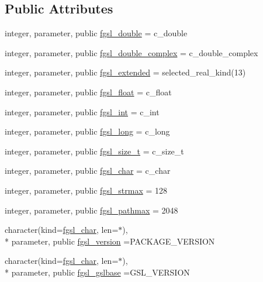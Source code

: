 \subsection*{Public Attributes}
\begin{DoxyCompactItemize}
\item 
integer, parameter, public \hyperlink{classfgsl_a9af5113378e0f000eb479d3f90196ddf}{fgsl\-\_\-double} = c\-\_\-double
\item 
integer, parameter, public \hyperlink{classfgsl_a66d0fde3788cc0c300046f8fcd07d702}{fgsl\-\_\-double\-\_\-complex} = c\-\_\-double\-\_\-complex
\item 
integer, parameter, public \hyperlink{classfgsl_a9f38abe97062020e8a507aaa5bc683ab}{fgsl\-\_\-extended} = selected\-\_\-real\-\_\-kind(13)
\item 
integer, parameter, public \hyperlink{classfgsl_a5721fab55a48ca577c4557fdb1861eb6}{fgsl\-\_\-float} = c\-\_\-float
\item 
integer, parameter, public \hyperlink{classfgsl_a222deda1d7a0c0e845ce4a683318efeb}{fgsl\-\_\-int} = c\-\_\-int
\item 
integer, parameter, public \hyperlink{classfgsl_a22fca1111887118eb07d5f9688ea38ad}{fgsl\-\_\-long} = c\-\_\-long
\item 
integer, parameter, public \hyperlink{classfgsl_a82c8fc2281b4c13609c41ae8b7f1cb1e}{fgsl\-\_\-size\-\_\-t} = c\-\_\-size\-\_\-t
\item 
integer, parameter, public \hyperlink{classfgsl_a12911ae4a4462f8e892d903081e77ab4}{fgsl\-\_\-char} = c\-\_\-char
\item 
integer, parameter, public \hyperlink{classfgsl_a1951faf9d6c8119266db0e5eee1865b7}{fgsl\-\_\-strmax} = 128
\item 
integer, parameter, public \hyperlink{classfgsl_a4531e537443b76eab7842214d4e86f01}{fgsl\-\_\-pathmax} = 2048
\item 
character(kind=\hyperlink{classfgsl_a12911ae4a4462f8e892d903081e77ab4}{fgsl\-\_\-char}, len=$\ast$), \\*
parameter, public \hyperlink{classfgsl_a3443bae7bac02745f1562e6c2f891656}{fgsl\-\_\-version} =P\-A\-C\-K\-A\-G\-E\-\_\-\-V\-E\-R\-S\-I\-O\-N
\item 
character(kind=\hyperlink{classfgsl_a12911ae4a4462f8e892d903081e77ab4}{fgsl\-\_\-char}, len=$\ast$), \\*
parameter, public \hyperlink{classfgsl_ad8d3e2a5a480d0a6e9569ef516c5dff4}{fgsl\-\_\-gslbase} =G\-S\-L\-\_\-\-V\-E\-R\-S\-I\-O\-N
\item 

\end{DoxyCompactItemize}
